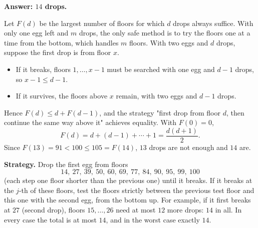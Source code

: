 \textbf{Answer: $14$ drops.}

Let $F(d)$ be the largest number of floors for which $d$ drops always suffice. With only one egg left and $m$ drops, the only safe method is to try the floors one at a time from the bottom, which handles $m$ floors. With two eggs and $d$ drops, suppose the first drop is from floor $x$.
\begin{itemize}
\item If it breaks, floors $1,\dots,x-1$ must be searched with one egg and $d-1$ drops, so $x-1\le d-1$.
\item If it survives, the floors above $x$ remain, with two eggs and $d-1$ drops.
\end{itemize}
Hence $F(d)\le d+F(d-1)$, and the strategy "first drop from floor $d$, then continue the same way above it" achieves equality. With $F(0)=0$,
\[
F(d)=d+(d-1)+\cdots+1=\dfrac{d(d+1)}{2}.
\]
Since $F(13)=91<100\le105=F(14)$, $13$ drops are not enough and $14$ are.

\textbf{Strategy.} Drop the first egg from floors
\[
14,\ 27,\ 39,\ 50,\ 60,\ 69,\ 77,\ 84,\ 90,\ 95,\ 99,\ 100
\]
(each step one floor shorter than the previous one) until it breaks. If it breaks at the $j$-th of these floors, test the floors strictly between the previous test floor and this one with the second egg, from the bottom up. For example, if it first breaks at $27$ (second drop), floors $15,\dots,26$ need at most $12$ more drops: $14$ in all. In every case the total is at most $14$, and in the worst case exactly $14$.
